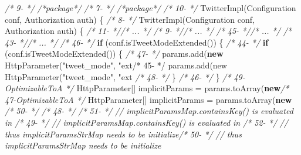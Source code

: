 \documentclass[
]{article}
\newenvironment{Shaded}{\begin{snugshade}}{\end{snugshade}}
\newcommand{\BuiltInTok}[1]{#1}
\newcommand{\CommentTok}[1]{\textcolor[rgb]{0.56,0.35,0.01}{\textit{#1}}}
\newcommand{\FunctionTok}[1]{\textcolor[rgb]{0.00,0.00,0.00}{#1}}
\newcommand{\KeywordTok}[1]{\textcolor[rgb]{0.13,0.29,0.53}{\textbf{#1}}}
\newcommand{\NormalTok}[1]{#1}
\newcommand{\StringTok}[1]{\textcolor[rgb]{0.31,0.60,0.02}{#1}}
\begin{document}
\begin{landscape}
\begin{Shaded}
\begin{Highlighting}[]
\CommentTok{/*  9-                 */}    \CommentTok{/*package*/}                                                \CommentTok{/*  7-                 */}    \CommentTok{/*package*/}                                                
\CommentTok{/* 10-                 */}    \FunctionTok{TwitterImpl}\NormalTok{(}\BuiltInTok{Configuration}\NormalTok{ conf, Authorization auth) \{      }\CommentTok{/*  8-                 */}    \FunctionTok{TwitterImpl}\NormalTok{(}\BuiltInTok{Configuration}\NormalTok{ conf, Authorization auth) \{      }
\CommentTok{/* 11-                 *//* ...  */}                                                     \CommentTok{/*  9-                 *//* ...  */}                                                     
\CommentTok{/* 45-                 *//* ...  */}                                                     \CommentTok{/* 43-                 *//* ...  */}                                                     
\CommentTok{/* 46-                 */}            \KeywordTok{if}\NormalTok{ (conf.}\FunctionTok{isTweetModeExtended}\NormalTok{()) \{                  }\CommentTok{/* 44-                 */}            \KeywordTok{if}\NormalTok{ (conf.}\FunctionTok{isTweetModeExtended}\NormalTok{()) \{                  }
\CommentTok{/* 47-                 */}\NormalTok{                params.}\FunctionTok{add}\NormalTok{(}\KeywordTok{new} \FunctionTok{HttpParameter}\NormalTok{(}\StringTok{"tweet_mode"}\NormalTok{, }\StringTok{"ext/* 45-                 */                params.add(new HttpParameter("}\NormalTok{tweet_mode}\StringTok{", "}\NormalTok{ext}
\CommentTok{/* 48-                 */}\NormalTok{            \}                                                  }\CommentTok{/* 46-                 */}\NormalTok{            \}                                                  }
\CommentTok{/* 49-OptimizableToA   */}\NormalTok{            HttpParameter[] implicitParams = params.}\FunctionTok{toArray}\NormalTok{(}\KeywordTok{new}\CommentTok{/* 47-OptimizableToA   */}\NormalTok{            HttpParameter[] implicitParams = params.}\FunctionTok{toArray}\NormalTok{(}\KeywordTok{new}
\CommentTok{/* 50-                 */}                                                               \CommentTok{/* 48-                 */}                                                               
\CommentTok{/* 51-                 */}            \CommentTok{// implicitParamsMap.containsKey() is evaluated in /* 49-                 */            // implicitParamsMap.containsKey() is evaluated in }
\CommentTok{/* 52-                 */}            \CommentTok{// thus implicitParamsStrMap needs to be initialize/* 50-                 */            // thus implicitParamsStrMap needs to be initialize}

\end{Highlighting}
\end{Shaded}
\end{landscape}
\end{document}

